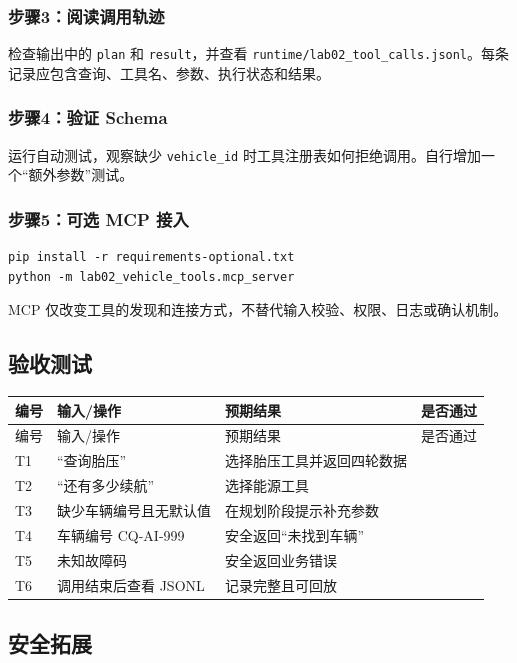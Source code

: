 \documentclass[UTF8,zihao=-4]{ctexart}
\begin{document}
\subsubsection{步骤3：阅读调用轨迹}

检查输出中的 \texttt{plan} 和 \texttt{result}，并查看 \texttt{runtime/lab02\_tool\_calls.jsonl}。每条记录应包含查询、工具名、参数、执行状态和结果。

\subsubsection{步骤4：验证 Schema}

运行自动测试，观察缺少 \texttt{vehicle\_id} 时工具注册表如何拒绝调用。自行增加一个“额外参数”测试。

\subsubsection{步骤5：可选 MCP 接入}

\begin{lstlisting}
pip install -r requirements-optional.txt
python -m lab02_vehicle_tools.mcp_server
\end{lstlisting}

MCP 仅改变工具的发现和连接方式，不替代输入校验、权限、日志或确认机制。

\subsection{验收测试}

\begin{longtable}{C{1.2cm} L{4.5cm} L{4.8cm} C{2.1cm}}
\toprule
编号 & 输入/操作 & 预期结果 & 是否通过\\
\midrule
\endfirsthead
\toprule
编号 & 输入/操作 & 预期结果 & 是否通过\\
\midrule
\endhead
T1 & “查询胎压” & 选择胎压工具并返回四轮数据 & \\
T2 & “还有多少续航” & 选择能源工具 & \\
T3 & 缺少车辆编号且无默认值 & 在规划阶段提示补充参数 & \\
T4 & 车辆编号 CQ-AI-999 & 安全返回“未找到车辆” & \\
T5 & 未知故障码 & 安全返回业务错误 & \\
T6 & 调用结束后查看 JSONL & 记录完整且可回放 & \\
\bottomrule
\end{longtable}

\subsection{安全拓展}
\end{document}

